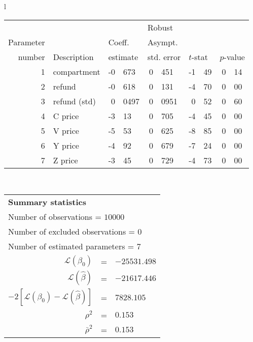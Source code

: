   \begin{tabular}{l}
\begin{tabular}{rlr@{.}lr@{.}lr@{.}lr@{.}l}
         &                       &   \multicolumn{2}{l}{}    & \multicolumn{2}{l}{Robust}  &     \multicolumn{4}{l}{}   \\
Parameter &                       &   \multicolumn{2}{l}{Coeff.}      & \multicolumn{2}{l}{Asympt.}  &     \multicolumn{4}{l}{}   \\
number &  Description                     &   \multicolumn{2}{l}{estimate}      & \multicolumn{2}{l}{std. error}  &   \multicolumn{2}{l}{$t$-stat}  &   \multicolumn{2}{l}{$p$-value}   \\

\hline

1 & compartment & -0&673 & 0&451 & -1&49 & 0&14\\
2 & refund & -0&618 & 0&131 & -4&70 & 0&00\\
3 & refund (std) & 0&0497 & 0&0951 & 0&52 & 0&60\\
4 & C price & -3&13 & 0&705 & -4&45 & 0&00\\
5 & V price & -5&53 & 0&625 & -8&85 & 0&00\\
6 & Y price & -4&92 & 0&679 & -7&24 & 0&00\\
7 & Z price & -3&45 & 0&729 & -4&73 & 0&00\\
\hline
\end{tabular}
\\
\begin{tabular}{rcl}
\multicolumn{3}{l}{\bf Summary statistics}\\
\multicolumn{3}{l}{ Number of observations = $10000$} \\
\multicolumn{3}{l}{ Number of excluded observations = $0$} \\
\multicolumn{3}{l}{ Number of estimated  parameters = $7$} \\
 $\mathcal{L}(\beta_0)$ &=&  $-25531.498$ \\
 $\mathcal{L}(\hat{\beta})$ &=& $-21617.446 $  \\
 $-2[\mathcal{L}(\beta_0) -\mathcal{L}(\hat{\beta})]$ &=& $7828.105$ \\
    $\rho^2$ &=&   $0.153$ \\
    $\bar{\rho}^2$ &=&    $0.153$ \\
\end{tabular}
  \end{tabular}
